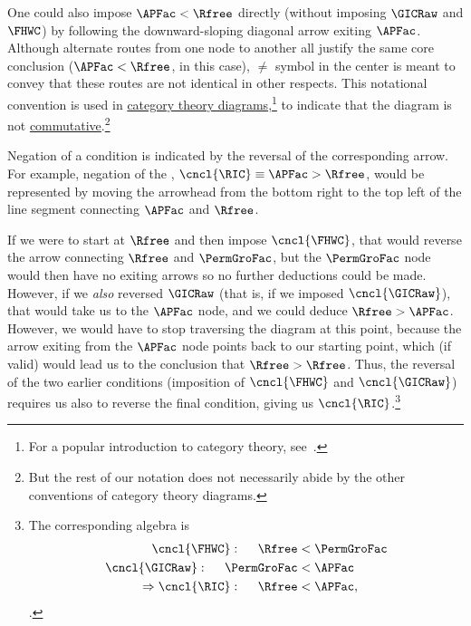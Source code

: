 \documentclass[\econtexRoot/BufferStockTheory]{subfiles}
\begin{document}
One could also impose $\APFac < \Rfree$ directly (without imposing $\GICRaw$ and $\FHWC$) by following the downward-sloping diagonal arrow exiting $\APFac$.
Although alternate routes from one node to another all justify the same core conclusion ($\APFac < \Rfree$, in this case), $\neq$ symbol in the center is meant to convey that these routes are not identical in other respects.
This notational convention is used in \href{https://en.wikipedia.org/wiki/Diagram_(category_theory)}{category theory diagrams},\footnote{For a popular introduction to category theory, see~\cite{riehl2017category}.} to indicate that the diagram is not \href{https://en.wikipedia.org/wiki/Commutative_diagram}{commutative}.\footnote{But the rest of our notation does not necessarily abide by the other conventions of category theory diagrams.}

Negation of a condition is indicated by the reversal of the corresponding arrow.
For example, negation of the {\RIC},  $\cncl{\RIC} \equiv \APFac > \Rfree$, would be represented by moving the arrowhead from the bottom right to the top left of the line segment connecting {$\APFac$} and $\Rfree$.

If we were to start at $\Rfree$ and then impose $\cncl{\FHWC}$, that would reverse the arrow connecting $\Rfree$ and $\PermGroFac$, but the $\PermGroFac$ node would then have no exiting arrows so no further deductions could be made.
However, if we \textit{also} reversed $\GICRaw$ (that is, if we imposed $\cncl{\GICRaw}$), that would take us to the $\APFac$ node, and we could deduce $\Rfree > \APFac$.
However, we would have to stop traversing the diagram at this point, because the arrow exiting from the $\APFac$ node points back to our starting point, which (if valid) would lead us to the conclusion that $\Rfree > \Rfree$.
Thus, the reversal of the two earlier conditions (imposition of $\cncl{\FHWC}$ and $\cncl{\GICRaw}$) requires us also to reverse the final condition, giving us $\cncl{\RIC}$.\footnote{The corresponding algebra is
\begin{equation}\begin{gathered}\begin{aligned}
  \cncl{\FHWC}:~~~~  \Rfree & < \PermGroFac \notag  
  \\ \cncl{\GICRaw}:~~~~ \PermGroFac & < \APFac %
                                \label{eq:cnclRIC}
  \\ \Rightarrow \cncl{\RIC}:~~~~\Rfree & < \APFac \notag,
\end{aligned}\end{gathered}\end{equation}.}
\end{document}
